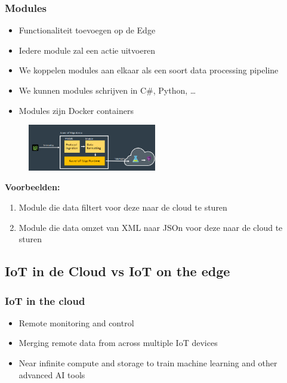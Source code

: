 \documentclass{article}
\newcommand{\bold}[1]{\textbf{#1}}
\begin{document}
\subsubsection{Modules}

\begin{itemize}
    \item Functionaliteit toevoegen op de Edge
    \item Iedere module zal een actie uitvoeren
    \item We koppelen modules aan elkaar als een soort data processing pipeline
    \item We kunnen modules schrijven in C\#, Python, \dots
    \item Modules zijn Docker containers
\end{itemize}

\begin{figure}[H]
    \centering
    \includegraphics[width=0.5\textwidth]{iot-edge4.png}
    \caption{}
\end{figure}

\bold{Voorbeelden:}

\begin{enumerate}
    \item Module die data filtert voor deze naar de cloud te sturen
    \item Module die data omzet van XML naar JSOn voor deze naar de cloud te sturen
\end{enumerate}

\subsection{IoT in de Cloud vs IoT on the edge}

\subsubsection{IoT in the cloud}

\begin{itemize}
    \item Remote monitoring and control
    \item Merging remote data from across multiple IoT devices
    \item Near infinite compute and storage to train machine learning and other advanced AI tools
\end{itemize}
\end{document}
